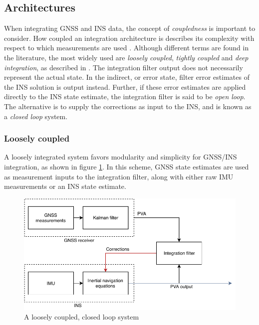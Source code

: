 

\subsection{Architectures}
    When integrating GNSS and INS data, the concept of \textit{coupledness} is important to consider. How coupled an integration architecture is describes its complexity with respect to which measurements are used \cite{groves2013principles, noureldin2012fundamentals}. Although different terms are found in the literature, the most widely used are \textit{loosely coupled}, \textit{tightly coupled} and \textit{deep integration}, as described in \cite{groves2013principles}. The integration filter output does not necessarily represent the actual state. In the indirect, or error state, filter error estimates of the INS solution is output instead. Further, if these error estimates are applied directly to the INS state estimate, the integration filter is said to be \textit{open loop}. The alternative is to supply the corrections as input to the INS, and is known as a \textit{closed loop} system.
    
    \subsubsection{Loosely coupled}
    A loosely integrated system favors modularity and simplicity for GNSS/INS integration, as shown in figure \ref{fig:loosely_coupled}. In this scheme, GNSS state estimates are used as measurement inputs to the integration filter, along with either raw IMU measurements or an INS state estimate. \\
    
    \begin{figure}
        \centering
        \includegraphics[scale=0.8]{Theory/bilder/loosely-coupled.pdf}
        \caption{A loosely coupled, closed loop system}
        \label{fig:loosely_coupled}
    \end{figure}
    
